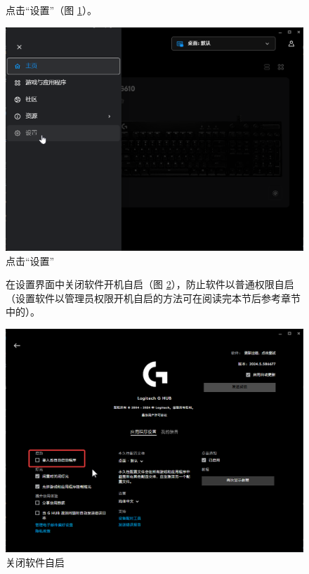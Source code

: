 \begin{figure}[H]
    \Centering
    \parbox[l]{\textwidth}{点击“设置”（图 \ref{ch0fig-lghub-setting}）。}
    \includegraphics[width=\textwidth]{docs/assets/intro/lghub_setting.png}
    \caption{点击“设置”}
    \label{ch0fig-lghub-setting}
\end{figure}

\begin{figure}[H]
    \Centering
    \parbox[l]{\textwidth}{在设置界面中关闭软件开机自启（图 \ref{ch0fig-disable-login-start}），防止软件以普通权限自启
    （设置软件以管理员权限开机自启的方法可在阅读完本节后参考章节中的）。}
    \includegraphics[width=\textwidth]{docs/assets/intro/disable_login_start.png}
    \caption{关闭软件自启}
    \label{ch0fig-disable-login-start}
\end{figure}

